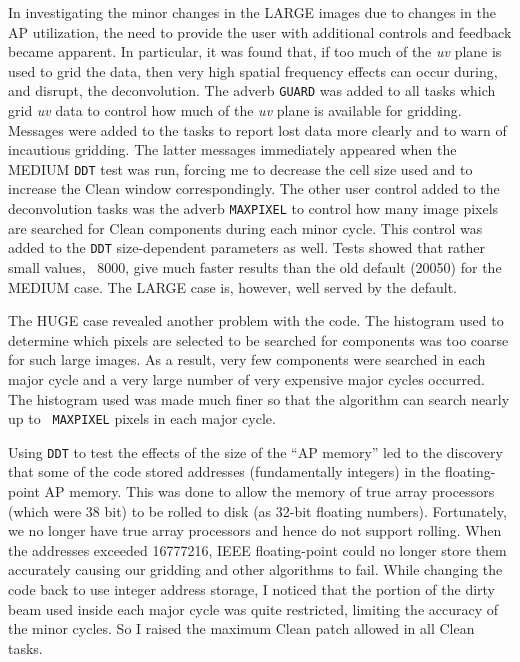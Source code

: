 In investigating the minor changes in the LARGE images due to changes
in the AP utilization, the need to provide the user with additional
controls and feedback became apparent.  In particular, it was found
that, if too much of the {\it uv} plane is used to grid the data,
then very high spatial frequency effects can occur during, and
disrupt, the deconvolution.  The adverb {\tt GUARD} was added to all
tasks which grid {\it uv} data to control how much of the {\it uv}
plane is available for gridding.  Messages were added to the tasks to
report lost data more clearly and to warn of incautious gridding.
The latter messages immediately appeared when the MEDIUM {\tt DDT}
test was run, forcing me to decrease the cell size used and to
increase the Clean window correspondingly.  The other user control
added to the deconvolution tasks was the adverb {\tt MAXPIXEL} to
control how many image pixels are searched for Clean components during
each minor cycle.  This control was added to the {\tt DDT}
size-dependent parameters as well.  Tests showed that rather small
values, \eg\ 8000, give much faster results than the old default
(20050) for the MEDIUM case.  The LARGE case is, however, well served
by the default.

The HUGE case revealed another problem with the code.  The histogram
used to determine which pixels are selected to be searched for
components was too coarse for such large images.  As a result, very
few components were searched in each major cycle and a very large
number of very expensive major cycles occurred.  The histogram used
was made much finer so that the algorithm can search nearly up to {\tt
MAXPIXEL} pixels in each major cycle.

Using {\tt DDT} to test the effects of the size of the ``AP memory''
led to the discovery that some of the code stored addresses
(fundamentally integers) in the floating-point AP memory.  This was
done to allow the memory of true array processors (which were 38 bit)
to be rolled to disk (as 32-bit floating numbers).  Fortunately, we no
longer have true array processors and hence do not support rolling.
When the addresses exceeded 16777216, IEEE floating-point could no
longer store them accurately causing our gridding and other algorithms
to fail.  While changing the code back to use integer address storage,
I noticed that the portion of the dirty beam used inside each major
cycle was quite restricted, limiting the accuracy of the minor cycles.
So I raised the maximum Clean patch allowed in all Clean tasks.

